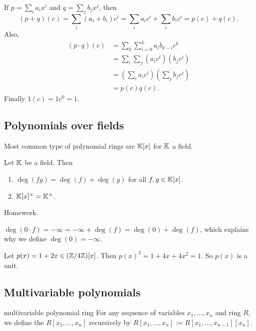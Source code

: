 \documentclass[12pt,letterpaper]{report}
\begin{document}
\begin{thmproof}
  If $p = \sum_i a_i x^i$ and $q = \sum_j b_j x^j$, then
  \[
    (p + q)(c) = \sum_i (a_i + b_i) c^i = \sum_i a_i c^i + \sum_i b_i c^i = p(c) + q(c).
  \]
  Also,
  \begin{align*}
    (p \cdot q)(c)
    &= \sum_k \sum_{i = 0}^k a_i b_{k - i} c^k \\
    &= \sum_i \sum_j (a_i c^i) (b_j c^j) \\
    &= \left(\sum_i a_i c^i\right) \left(\sum_j b_j c^j\right) \\
    &= p(c) q(c).
  \end{align*}
  Finally $1(c) = 1c^0 = 1$.
\end{thmproof}

\pagebreak
\subsection{Polynomials over fields}

Most common type of polynomial rings are $\mathbb{K}[x]$ for $\mathbb{K}$ a field.

\begin{prop}{}{}
  Let $\mathbb{K}$ be a field.
  Then
  \begin{enumerate}
    \item $\deg(fg) = \deg(f) + \deg(g)$ for all $f, g \in \mathbb{K}[x]$.
    \item $\mathbb{K}[x]^\times = \mathbb{K}^\times$.
  \end{enumerate}
\end{prop}

\begin{thmproof}
  Homework.
\end{thmproof}

\begin{ex}
  $\deg(0 \cdot f) = -\infty = -\infty + \deg(f) = \deg(0) + \deg(f)$, which explains why we
  define $\deg(0) = -\infty$.
\end{ex}

\begin{ex}
  Let $p(x) = 1 + 2x \in (\mathbb{Z}/{4}\mathbb{Z})[x]$.
  Then $p(x)^2 = 1 + 4x + 4x^2 = 1$.
  So $p(x)$ is a unit.
\end{ex}

\pagebreak
\subsection{Multivariable polynomials}

\begin{defn}{multivariable polynomial ring}
  For any sequence of variables $x_1, \ldots, x_n$ and ring $R$, we define the
   $R[x_1, \ldots, x_n]$ recursively by
  $R[x_1, \ldots, x_n] := R[x_1, \ldots, x_{n - 1}][x_n]$.
\end{defn}
\end{document}
